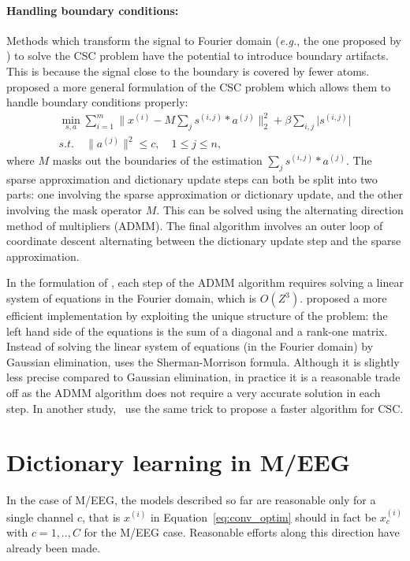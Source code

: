 \paragraph{Handling boundary conditions:} Methods which transform the signal to Fourier domain (\textit{e.g.}, the one proposed by \citet{grosse2012shift}) to solve the CSC problem have the potential to introduce boundary artifacts. This is because the signal close to the boundary is covered by fewer atoms. \citet{heide2015fast} proposed a more general formulation of the CSC problem which allows them to handle boundary conditions properly:
%
\begin{eqnarray}
\min_{s, a} \sum_{i=1}^{m} \|x^{(i)} - M \sum_{j} s^{(i, j)} * a^{(j)} \|_{2}^{2} + \beta \sum_{i,j} \lvert s^{(i,j)} \rvert \\
s.t. \quad \| a^{(j)} \|^{2} \leq c, \quad 1 \leq j \leq n,
\end{eqnarray}
%
where $M$ masks out the boundaries of the estimation $\sum_{j} s^{(i,j)} * a^{(j)}$. The sparse approximation and dictionary update steps can both be split into two parts: one involving the sparse approximation or dictionary update, and the other involving the mask operator $M$. This can be solved using the alternating direction method of multipliers (ADMM). The final algorithm involves an outer loop of coordinate descent alternating between the dictionary update step and the sparse approximation. 

In the formulation of \citet{heide2015fast}, each step of the ADMM algorithm requires solving a linear system of equations in the Fourier domain, which is $O(Z^3)$. \citet{wohlberg2016efficient} proposed a more efficient implementation by exploiting the unique structure of the problem: the left hand side of the equations is the sum of a diagonal and a rank-one matrix. Instead of solving the linear system of equations (in the Fourier domain) by Gaussian elimination, \cite{wohlberg2016efficient} uses the Sherman-Morrison formula. Although it is slightly less precise compared to Gaussian elimination, in practice it is a reasonable trade off as the ADMM algorithm does not require a very accurate solution in each step. In another study,~\citet{vsorel2016fast} use the same trick to propose a faster algorithm for CSC.

\section{Dictionary learning in M/EEG}

In the case of M/EEG, the models described so far are reasonable only for a single channel $c$, that is $x^{(i)}$ in Equation~\ref{eq:conv_optim} should in fact be $x^{(i)}_{c}$ with $c=1,..,C$ for the M/EEG case. Reasonable efforts along this direction have already been made. 

